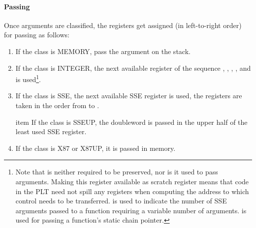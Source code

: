 \paragraph{Passing}
Once arguments are classified, the registers get assigned (in
left-to-right order) for passing as follows:

\begin{enumerate}
\item If the class is MEMORY, pass the argument on the stack.

\item If the class is INTEGER, the next available register of the
  sequence \RDI, \RSI, \RDX, \RCX,  and  is
  used\footnote{Note that  is neither required to be
    preserved, nor is it used to pass arguments.  Making this register
    available as scratch register means that code in the PLT need not
    spill any registers when computing the address to which control
    needs to be transferred.  \RAX is used to indicate the number of
    SSE arguments passed to a function requiring a variable number of
    arguments.  is used for passing a function's static chain
    pointer.}.

\item If the class is SSE, the next available SSE register is used, the
   registers are taken in the order from  to .
   
item If the class is SSEUP, the doubleword is passed in the upper
   half of the least used SSE register.

\item If the class is X87 or X87UP, it is passed in memory.
\end{enumerate}

